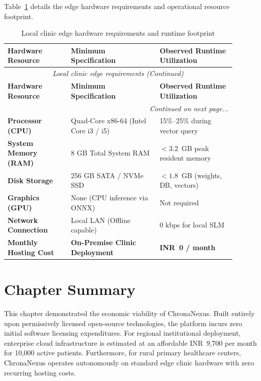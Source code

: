Table~\ref{tab:8_3_edge} details the edge hardware requirements and operational resource footprint.

\small
\begin{longtable}{@{}p{0.25\linewidth} p{0.35\linewidth} p{0.30\linewidth}@{}}
\caption{Local clinic edge hardware requirements and runtime footprint}\label{tab:8_3_edge} \\
\toprule
\textbf{Hardware Resource} & \textbf{Minimum Specification} & \textbf{Observed Runtime Utilization} \\
\midrule
\endfirsthead
\toprule
\multicolumn{3}{c}{\small\textit{Local clinic edge requirements (Continued)}} \\[4pt]
\midrule
\textbf{Hardware Resource} & \textbf{Minimum Specification} & \textbf{Observed Runtime Utilization} \\
\midrule
\endhead
\midrule
\multicolumn{3}{r}{\footnotesize\textit{Continued on next page...}} \\
\bottomrule
\endfoot
\bottomrule
\endlastfoot
\textbf{Processor (CPU)} & Quad-Core x86-64 (Intel Core i3 / i5) & 15\%--25\% during vector query \\
\textbf{System Memory (RAM)} & 8 GB Total System RAM & $< 3.2$~GB peak resident memory \\
\textbf{Disk Storage} & 256 GB SATA / NVMe SSD & $< 1.8$~GB (weights, DB, vectors) \\
\textbf{Graphics (GPU)} & None (CPU inference via ONNX) & Not required \\
\textbf{Network Connection} & Local LAN (Offline capable) & 0 kbps for local SLM \\
\midrule
\textbf{Monthly Hosting Cost} & \textbf{On-Premise Clinic Deployment} & \textbf{INR~0 / month} \\
\bottomrule
\end{longtable}
\normalsize


\section{Chapter Summary}

This chapter demonstrated the economic viability of ChronaNexus. Built entirely upon permissively licensed open-source technologies, the platform incurs zero initial software licensing expenditures. For regional institutional deployment, enterprise cloud infrastructure is estimated at an affordable INR~9,700 per month for 10,000 active patients. Furthermore, for rural primary healthcare centers, ChronaNexus operates autonomously on standard edge clinic hardware with zero recurring hosting costs.

